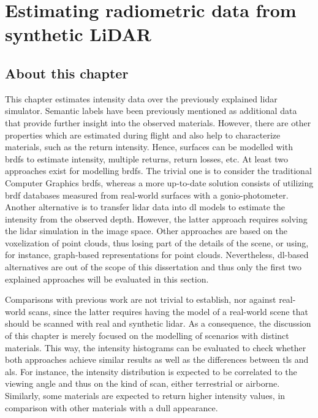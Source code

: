 \setchapterpreamble[u]{\margintoc}
\chapter{Estimating radiometric data from synthetic LiDAR}
\label{sec:lidar_intensity}

\section*{About this chapter}

This chapter estimates intensity data over the previously explained \acrshort{lidar} simulator. Semantic labels have been previously mentioned as additional data that provide further insight into the observed materials. However, there are other properties which are estimated during flight and also help to characterize materials, such as the return intensity. Hence, surfaces can be modelled with \acrshort{brdf}s to estimate intensity, multiple returns, return losses, etc. At least two approaches exist for modelling \acrshort{brdf}s. The trivial one is to consider the traditional Computer Graphics \acrshort{brdf}s, whereas a more up-to-date solution consists of utilizing \acrshort{brdf} databases measured from real-world surfaces with a gonio-photometer. Another alternative is to transfer \acrshort{lidar} data into \acrshort{dl} models to estimate the intensity from the observed depth. However, the latter approach requires solving the \acrshort{lidar} simulation in the image space. Other approaches are based on the voxelization of point clouds, thus losing part of the details of the scene, or using, for instance, graph-based representations for point clouds. Nevertheless, \acrshort{dl}-based alternatives are out of the scope of this dissertation and thus only the first two explained approaches will be evaluated in this section.

Comparisons with previous work are not trivial to establish, nor against real-world scans, since the latter requires having the model of a real-world scene that should be scanned with real and synthetic \acrshort{lidar}. As a consequence, the discussion of this chapter is merely focused on the modelling of scenarios with distinct materials. This way, the intensity histograms can be evaluated to check whether both approaches achieve similar results as well as the differences between \acrshort{tls} and \acrshort{als}. For instance, the intensity distribution is expected to be correlated to the viewing angle and thus on the kind of scan, either terrestrial or airborne. Similarly, some materials are expected to return higher intensity values, in comparison with other materials with a dull appearance.

